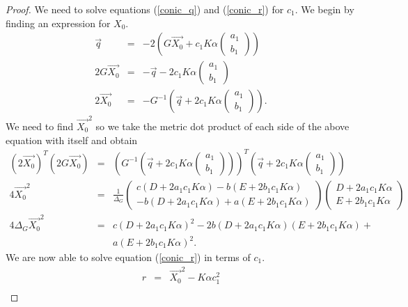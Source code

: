 \begin{proof}
We need to solve equations (\ref{conic_q}) and (\ref{conic_r}) for $c_1$. We begin by finding an expression for $X_0$.
\begin{eqnarray}
\vec{q} & = & -2\left(G\vec{X_0} + c_1K\alpha\begin{pmatrix}a_1 \\ b_1\end{pmatrix}\right)\nonumber\\
2G\vec{X_0} & = & -\vec{q} -2c_1K\alpha\begin{pmatrix}a_1 \\ b_1\end{pmatrix}\nonumber\\
2\vec{X_0} & = & -G^{-1}\left(\vec{q} + 2c_1K\alpha\begin{pmatrix}a_1 \\ b_1\end{pmatrix} \right).\label{eq:focus}
\end{eqnarray}
We need to find $\vec{X_0}^2$ so we take the metric dot product of each side of the above equation with itself and obtain
\begin{eqnarray*}
(2\vec{X_0})^T(2G\vec{X_0}) & = & \left(G^{-1}\left(\vec{q} + 2c_1K\alpha\begin{pmatrix} a_1 \\ b_1 \end{pmatrix} \right)\right)^T\left(\vec{q} + 2c_1K\alpha\begin{pmatrix} a_1 \\ b_1 \end{pmatrix} \right)\nonumber\\
4\vec{X_0}^2 & = & \frac{1}{\Delta_G} \begin{pmatrix} c(D + 2a_1c_1K\alpha) - b(E + 2b_1c_1K\alpha) \\ -b(D + 2a_1c_1K\alpha) + a(E + 2b_1c_1K\alpha)  \end{pmatrix} \begin{pmatrix} D + 2a_1c_1K\alpha \\ E + 2b_1c_1K\alpha \end{pmatrix}\\
4\Delta_G\vec{X_0}^2 & = & c(D + 2a_1c_1K\alpha)^2 -2b(D + 2a_1c_1K\alpha)(E + 2b_1c_1K\alpha) + \\
 &  & a(E + 2b_1c_1K\alpha)^2.
\end{eqnarray*}
We are now able to solve equation (\ref{conic_r}) in terms of $c_1$.
\begin{eqnarray*}
r & = & \vec{X_0}^2 - K\alpha c_1^2\\

\end{eqnarray*}
\end{proof}
